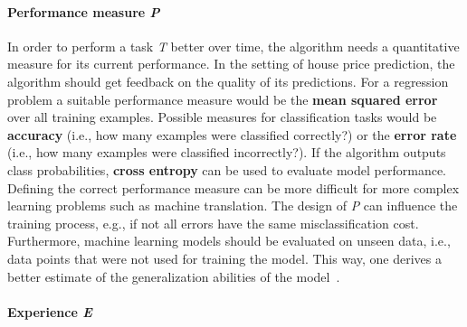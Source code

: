 \paragraph{Performance measure \textit{P}}

In order to perform a task \textit{T} better over time, the algorithm needs
a quantitative measure for its current performance. In the setting of
house price prediction, the algorithm should get feedback on the quality of its
predictions. For a regression problem a suitable performance measure would be 
the \textbf{mean squared error} over all training examples. Possible measures
for classification tasks would be \textbf{accuracy} (i.e., how many examples
were classified correctly?) or the \textbf{error rate} (i.e., how many
examples were classified incorrectly?). If the algorithm outputs class 
probabilities, \textbf{cross entropy} can be used to evaluate model
performance. Defining the correct performance measure can be more difficult
for more complex learning problems such as machine translation. The design of 
\textit{P} can influence the training process, e.g., if not all errors have the
same misclassification cost. Furthermore, machine learning models should be evaluated on unseen
data, i.e., data points that were not used for training the model. This way,
one derives a better estimate of the generalization abilities of the model~\cite{Bishop2006, Goodfellow2016, Mitchell1997}.

\paragraph{Experience \textit{E}}

